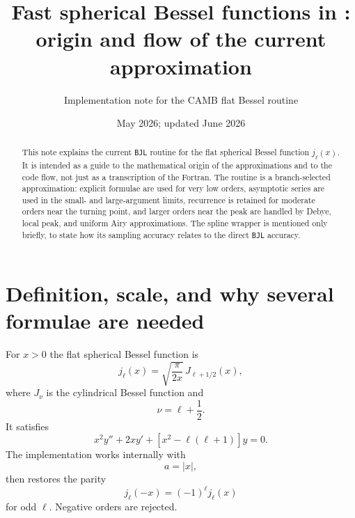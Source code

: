 \documentclass[11pt,a4paper]{article}
\title{Fast spherical Bessel functions in \code{FlatBessels}: origin and flow of the current \code{BJL} approximation}
\author{Implementation note for the CAMB flat Bessel routine}
\date{May 2026; updated June 2026}
\newcommand{\code}[1]{\texttt{#1}}
\begin{document}
\maketitle

\begin{abstract}
This note explains the current \code{BJL} routine for the flat spherical Bessel function $j_\ell(x)$.  It is intended as a guide to the mathematical origin of the approximations and to the code flow, not just as a transcription of the Fortran.  The routine is a branch-selected approximation: explicit formulae are used for very low orders, asymptotic series are used in the small- and large-argument limits, recurrence is retained for moderate orders near the turning point, and larger orders near the peak are handled by Debye, local peak, and uniform Airy approximations.  The spline wrapper is mentioned only briefly, to state how its sampling accuracy relates to the direct \code{BJL} accuracy.
\end{abstract}

\tableofcontents

\section{Definition, scale, and why several formulae are needed}

For $x>0$ the flat spherical Bessel function is
\begin{equation}
  j_\ell(x)=\sqrt{\frac{\pi}{2x}}\,J_{\ell+1/2}(x),
\end{equation}
where $J_\nu$ is the cylindrical Bessel function and
\begin{equation}
  \nu = \ell + \frac12 .
\end{equation}
It satisfies
\begin{equation}
  x^2 y'' + 2x y' + \left[x^2-\ell(\ell+1)\right]y = 0 .
\end{equation}
The implementation works internally with
\begin{equation}
  a=|x|,
\end{equation}
then restores the parity
\begin{equation}
  j_\ell(-x)=(-1)^\ell j_\ell(x)
\end{equation}
for odd $\ell$.  Negative orders are rejected.
\end{document}

